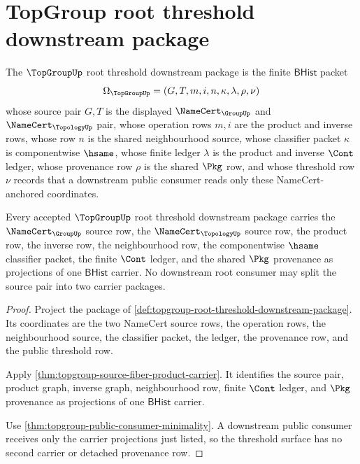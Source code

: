 \section{TopGroup root threshold downstream package}
\label{sec:topgroup-root-threshold-downstream}

\begin{definition}
\label{def:topgroup-root-threshold-downstream-package}
The $\TopGroupUp$ root threshold downstream package is the finite
$\mathsf{BHist}$ packet
$$
\Omega_{\TopGroupUp}=(G,T,m,i,n,\kappa,\lambda,\rho,\nu)
$$
whose source pair $G,T$ is the displayed
$\NameCert_{\GroupUp}$ and $\NameCert_{\TopologyUp}$ pair, whose operation
rows $m,i$ are the product and inverse rows, whose row $n$ is the shared
neighbourhood source, whose classifier packet $\kappa$ is componentwise
$\hsame$, whose finite ledger $\lambda$ is the product and inverse
$\Cont$ ledger, whose provenance row $\rho$ is the shared $\Pkg$ row, and
whose threshold row $\nu$ records that a downstream public consumer reads only
these NameCert-anchored coordinates.
\end{definition}

\begin{theorem}
\label{thm:topgroup-root-threshold-carrier-scope}
Every accepted $\TopGroupUp$ root threshold downstream package carries the
$\NameCert_{\GroupUp}$ source row, the $\NameCert_{\TopologyUp}$ source row,
the product row, the inverse row, the neighbourhood row, the componentwise
$\hsame$ classifier packet, the finite $\Cont$ ledger, and the shared
$\Pkg$ provenance as projections of one $\mathsf{BHist}$ carrier. No
downstream root consumer may split the source pair into two carrier packages.
\end{theorem}
\begin{proof}
Project the package of
\autoref{def:topgroup-root-threshold-downstream-package}. Its coordinates are
the two NameCert source rows, the operation rows, the neighbourhood source,
the classifier packet, the ledger, the provenance row, and the public
threshold row.

Apply \autoref{thm:topgroup-source-fiber-product-carrier}. It identifies the
source pair, product graph, inverse graph, neighbourhood row, finite
$\Cont$ ledger, and $\Pkg$ provenance as projections of one
$\mathsf{BHist}$ carrier.

Use \autoref{thm:topgroup-public-consumer-minimality}. A downstream public
consumer receives only the carrier projections just listed, so the threshold
surface has no second carrier or detached provenance row.
\end{proof}

